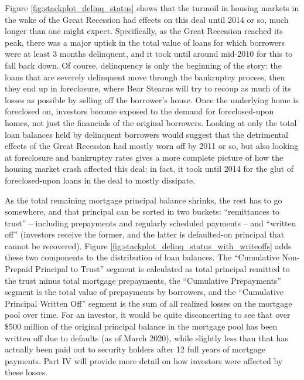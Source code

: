 \documentclass[12pt]{article}
\begin{document}
Figure \ref{fig:stackplot_delinq_status} shows that the turmoil in housing markets in the wake of the Great Recession had effects on this deal until 2014 or so, much longer than one might expect. Specifically, as the Great Recession reached its peak, there was a major uptick in the total value of loans for which borrowers were at least 3 months delinquent, and it took until around mid-2010 for this to fall back down. Of course, delinquency is only the beginning of the story: the loans that are severely delinquent move through the bankruptcy process, then they end up in foreclosure, where Bear Stearns will try to recoup as much of its losses as possible by selling off the borrower’s house. Once the underlying home is foreclosed on, investors become exposed to the demand for foreclosed-upon homes, not just the financials of the original borrowers. Looking at only the total loan balances held by delinquent borrowers would suggest that the detrimental effects of the Great Recession had mostly worn off by 2011 or so, but also looking at foreclosure and bankruptcy rates gives a more complete picture of how the housing market crash affected this deal: in fact, it took until 2014 for the glut of foreclosed-upon loans in the deal to mostly dissipate.

	As the total remaining mortgage principal balance shrinks, the rest has to go somewhere, and that principal can be sorted in two buckets: “remittances to trust” – including prepayments and regularly scheduled payments – and “written off” (investors receive the former, and the latter is defaulted-on principal that cannot be recovered). Figure \ref{fig:stackplot_delinq_status_with_writeoffs} adds these two components to the distribution of loan balances. The “Cumulative Non-Prepaid Principal to Trust” segment is calculated as total principal remitted to the trust minus total mortgage prepayments, the “Cumulative Prepayments” segment is the total value of prepayments by borrowers, and the “Cumulative Principal Written Off” segment is the sum of all realized losses on the mortgage pool over time. For an investor, it would be quite disconcerting to see that over \$500 million of the original principal balance in the mortgage pool has been written off due to defaults (as of March 2020), while slightly less than that has actually been paid out to security holders after 12 full years of mortgage payments. Part IV will provide more detail on how investors were affected by these losses.
\end{document}
